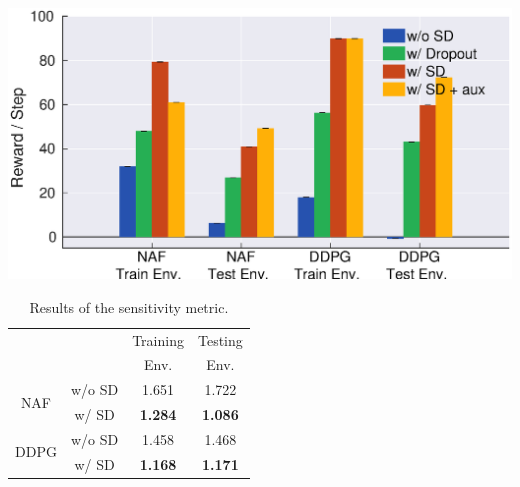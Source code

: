 \documentclass[../thesis.tex]{subfiles}
\begin{document}
\begin{table}[t]
  \begin{minipage}[t]{0.45\linewidth}
    \centering
    \vskip -0.1in
    \includegraphics[width=\columnwidth]{./MultimodalDRL/fig/random_sensor_failure_normalize_with_aux}
    \label{fig:random_sensor_failure}
  \end{minipage}
  \begin{minipage}[t]{0.45\linewidth}
    \vskip -0.1in
    \caption{Results of the sensitivity metric.} %
    \label{table:policy-ratio}
    \vskip 0.1in
    \centering
    \begin{small}
    \begin{sc}
    \begin{tabular}{cccc}
    \toprule 
    \centering
     & & Training & Testing  \\ 
     & & Env. & Env. \\ \midrule \midrule
    \multirow{2}{*}{NAF}  & w/o SD & 1.651 & 1.722 \\
                          & w/ SD  & \textbf{1.284} & \textbf{1.086} \\ \midrule
    \multirow{2}{*}{DDPG} & w/o SD & 1.458 & 1.468 \\
                          & w/ SD  & \textbf{1.168} & \textbf{1.171} \\ \toprule
    \end{tabular}
    \end{sc}
    \end{small}
  \end{minipage}
\end{table}
\end{document}
